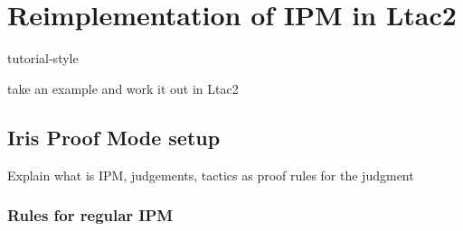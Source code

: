 \chapter{Reimplementation of IPM in Ltac2}

tutorial-style

take an example and work it out in Ltac2

\section{Iris Proof Mode setup}

Explain what is IPM, judgements, tactics as proof rules for the judgment


\subsection{Rules for regular IPM}


